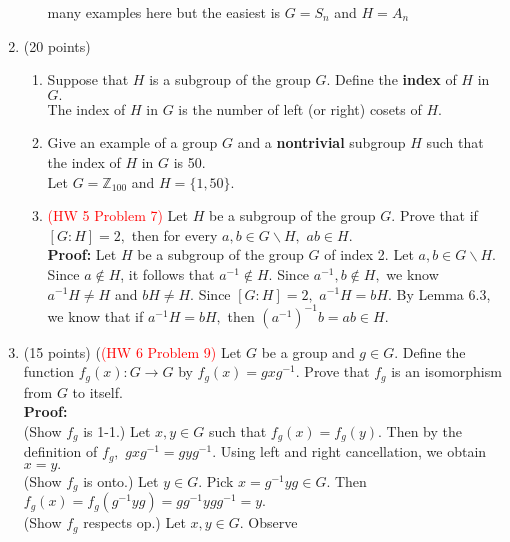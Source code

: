\documentclass[12pt]{article}
\renewcommand{\emph}[1]{\textsf{\textbf{#1}}}
\newcommand{\bbZ}{\mathbb{Z}}
\begin{document}
\begin{enumerate}
\begin{enumerate}
	many examples here but the easiest is $G=S_n$ and $H=A_n$
	\vfill
	\end{enumerate}
\newpage

\item (20 points) 
	\begin{enumerate}
	\item Suppose that $H$ is a subgroup of the group $G$. Define the \emph{index} of $H$ in $G.$\\
	
	The index of $H$ in $G$ is the number of left (or right) cosets of $H$.\\
	\vfill
	\item Give an example of a group $G$ and a \emph{nontrivial} subgroup $H$ such that the index of $H$ in $G$ is 50.\\
	
	Let $G=\bbZ_{100}$ and $H=\{1,50\}.$\\
	\vfill
	\item \textcolor{red}{(HW 5 Problem 7)} Let $H$ be a subgroup of the group $G.$ Prove that if $[G : H]=2,$ then for every $a,b \in G\backslash H,$ $ab \in H.$\\
	
	\textbf{Proof:} Let $H$ be a subgroup of the group $G$ of index 2. Let $a,b \in G\backslash H.$ Since $a \not \in H$, it follows that $a^{-1} \not \in H.$ Since $a^{-1},b \not \in H,$ we know $a^{-1}H \not = H$ and $bH \not = H.$ Since $[G:H]=2,$ $a^{-1}H=bH.$ By Lemma 6.3, we know that if $a^{-1}H=bH,$ then $(a^{-1})^{-1}b=ab \in H.$
	\end{enumerate}

\item (15 points) (\textcolor{red}{(HW 6 Problem 9)} Let $G$ be a group and $g \in G.$ Define the function $f_g(x) : G \to G$ by $f_g(x)=gxg^{-1}.$ Prove that $f_g$ is an isomorphism from $G$ to itself.\\

\textbf{Proof:}\\
(Show $f_g$ is 1-1.) Let $x,y \in G$ such that $f_g(x)=f_g(y).$ Then by the definition of $f_g,$ $gxg^{-1}=gyg^{-1}.$ Using left and right cancellation, we obtain $x=y.$\\

(Show $f_g$ is onto.) Let $y \in G.$ Pick $x=g^{-1}yg \in G.$ Then $f_g(x)=f_g(g^{-1}yg)=gg^{-1}ygg^{-1}=y.$\\

(Show $f_g$ respects op.) Let $x,y \in G.$ Observe 


\end{enumerate}
\end{document}
